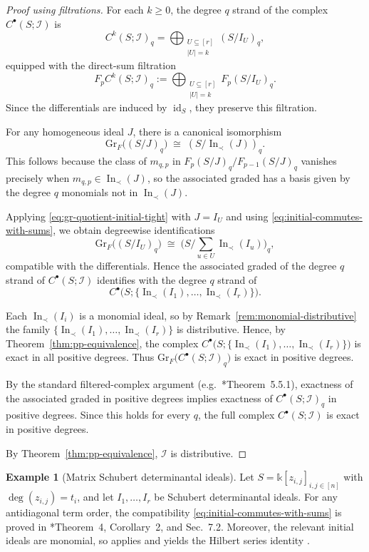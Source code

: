 \documentclass[12pt,reqno]{amsart}
\theoremstyle{definition}
\newtheorem{example}[lemma]{Example}
\newcommand{\inn}{\operatorname{In}}
\newcommand{\id}{\operatorname{id}}
\renewcommand{\k}{\mathbb{k}}
\newcommand{\cI}{\mathcal{I}}
\newcommand{\gr}{\mathrm{Gr}}
\begin{document}
{\begin{proof}[Proof using filtrations]
For each $k\ge 0$, the degree $q$ strand of the complex $C^\bullet(S; \cI)$ is
\[
C^k(S;\cI)_q
=
\bigoplus_{\substack{U\subseteq [r]\\ |U|=k}}
(S/I_U)_q,
\]
equipped with the direct-sum filtration
\[
F_p C^k(S;\cI)_q
:=
\bigoplus_{\substack{U\subseteq [r]\\ |U|=k}}
F_p(S/I_U)_q.
\]
Since the differentials are induced by $\id_S$, they preserve this filtration.

For any homogeneous ideal $J$, there is a canonical isomorphism
\begin{equation}\label{eq:gr-quotient-initial-tight}
\gr_F\!\bigl((S/J)_q\bigr)
\;\cong\;
(S/\inn_\prec(J))_q.
\end{equation}
This follows because the class of $m_{q,p}$ in 
$F_p(S/J)_q/F_{p-1}(S/J)_q$ vanishes precisely when 
$m_{q,p}\in \inn_\prec(J)$, so the associated graded has a basis given by the degree $q$ monomials not in $\inn_\prec(J)$.

Applying \eqref{eq:gr-quotient-initial-tight} with $J=I_U$ and using
\eqref{eq:initial-commutes-with-sums}, we obtain degreewise identifications
\[
\gr_F\!\bigl((S/I_U)_q\bigr)
\;\cong\;
\bigl(S/\sum_{u\in U}\inn_\prec(I_u)\bigr)_q,
\]
compatible with the differentials.
Hence the associated graded of the degree $q$ strand of
$C^\bullet(S;\cI)$ identifies with the degree $q$ strand of
\[
C^\bullet\!\bigl(S;\{\inn_\prec(I_1),\dots,\inn_\prec(I_r)\}\bigr).
\]

Each $\inn_\prec(I_i)$ is a monomial ideal, so by Remark~\ref{rem:monomial-distributive} the family
$\{\inn_\prec(I_1),\dots,\inn_\prec(I_r)\}$ is distributive. Hence, by Theorem~\ref{thm:pp-equivalence},
the complex $C^\bullet\!\bigl(S;\{\inn_\prec(I_1),\dots,\inn_\prec(I_r)\}\bigr)$ is exact in all positive degrees.
Thus $\gr_F\bigl(C^\bullet(S;\cI)_q\bigr)$ is exact in positive degrees.

By the standard filtered-complex argument (e.g.\ \cite{weibel1994introduction}*{Theorem~5.5.1}),
exactness of the associated graded in positive degrees implies exactness of
$C^\bullet(S;\cI)_q$ in positive degrees.
Since this holds for every $q$, the full complex $C^\bullet(S;\cI)$
is exact in positive degrees.

By Theorem~\ref{thm:pp-equivalence}, $\cI$ is distributive.
\end{proof}

\begin{example}[Matrix Schubert determinantal ideals]
Let $S=\k[z_{i,j}]_{i,j\in[n]}$ with $\deg(z_{i,j})=t_i$, and let $I_1,\dots,I_r$ be Schubert determinantal ideals.
For any antidiagonal term order, the compatibility \eqref{eq:initial-commutes-with-sums} is proved in
\cite{knutson2009frobenius}*{Theorem~4, Corollary~2, and Sec.~7.2}.
Moreover, the relevant initial ideals are monomial, so  applies and yields the Hilbert series identity .
\end{example}


}
\end{document}
